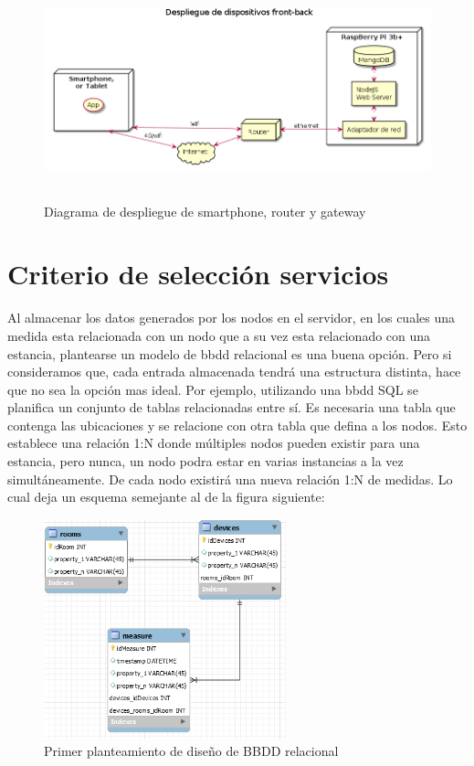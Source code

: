 \begin{figure}[hbt!]
\centering
\includegraphics[height=2.5in]{figures/diagrams/physical-devices/front-back.png}
\caption[Despligue de front]{Diagrama de despliegue de smartphone, router y gateway\footnotemark}
\end{figure}



\section{Criterio de selección servicios}
\label{ch:Capitulo4.5}

Al almacenar los datos generados por los nodos en el servidor, en los cuales una medida esta relacionada con un nodo que a su vez esta relacionado con una estancia, plantearse un modelo de \gls{bbdd} relacional es una buena opción. Pero si consideramos que, cada entrada almacenada tendrá una estructura distinta, hace que no sea la opción mas ideal. Por ejemplo, utilizando una \gls{bbdd} SQL se planifica un conjunto de tablas relacionadas entre sí. Es necesaria una tabla que contenga las ubicaciones y se relacione con otra tabla que defina a los nodos. Esto establece una relación 1:N donde múltiples nodos pueden existir para una estancia, pero nunca, un nodo podra estar en varias instancias a la vez simultáneamente. De cada nodo existirá una nueva relación 1:N de medidas. Lo cual deja un esquema semejante al de la figura siguiente:

\begin{figure}[hbt!]
\centering
\label{sqlschema1}
\includegraphics[height=2.5in]{figures/SQLSchemaExample_1.png}
\caption[Primer planteamiento de diseño de BBDD relacional]{Primer planteamiento de diseño de BBDD relacional\footnotemark}
\end{figure}

